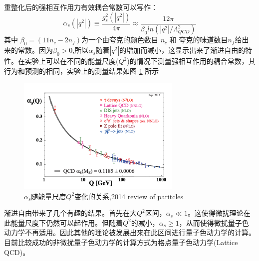重整化后的强相互作用力有效耦合常数可以写作：
\begin{equation}
    \alpha_{s}(|q^2|) \equiv \frac{g_s^2(|q^2|)}{4\pi} \approx \frac{12\pi}{\beta_0 ln(|q^2|/\Lambda_{QCD}^2)}
\end{equation}
其中 $\beta_0 = (11n_c-2n_f)$为一个由夸克的颜色数目 $n_c$ 和 夸克的味道数目$n_f$给出来的常数。因为$\beta_0 > 0$,所以$\alpha_{s}$随着$|q^2|$的增加而减小，这显示出来了渐进自由的特性。在实验上可以在不同的能量尺度($Q^2$)的情况下测量强相互作用的耦合常数，其行为和预测的相同，实验上的测量结果如图 \ref{fig:Alpha_S} 所示
\begin{figure}[htb]
    \begin{center}
    \includegraphics[width=0.7\textwidth,clip]{figures/Chapter1/Alpha_s.png}
    \end{center}
    \caption[$\alpha_s$随能量尺度$Q^2$变化的关系]{$\alpha_s$随能量尺度$Q^2$变化的关系,2014 review of paritcles}
    \label{fig:Alpha_S}
\end{figure}

渐进自由带来了几个有趣的结果。首先在大$Q^2$区间，$\alpha_s \ll 1$。这使得微扰理论在此能量尺度下仍然可以起作用。但随着$Q^2$的减小，$\alpha_s \geq 1$，从而使得微扰量子色动力学不再适用。因此其他的理论被发展出来在此区间进行量子色动力学的计算。目前比较成功的非微扰量子色动力学的计算方式为格点量子色动力学(Lattice QCD)。
